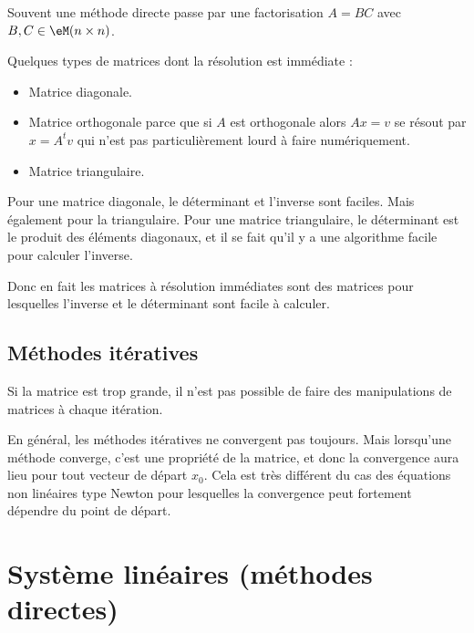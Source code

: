 Souvent une méthode directe passe par une factorisation \( A=BC\) avec \( B,C\in \eM(n\times n)\).

Quelques types de matrices dont la résolution est immédiate :
\begin{itemize}
    \item Matrice diagonale.
    \item Matrice orthogonale parce que si \( A\) est orthogonale alors \( Ax=v\) se résout par \( x=A^tv\) qui n'est pas particulièrement lourd à faire numériquement.
    \item Matrice triangulaire.
\end{itemize}

\begin{remark}
    Pour une matrice diagonale, le déterminant et l'inverse sont faciles. Mais également pour la triangulaire. Pour une matrice triangulaire, le déterminant est le produit des éléments diagonaux, et il se fait qu'il y a une algorithme facile pour calculer l'inverse.

    Donc en fait les matrices à résolution immédiates sont des matrices pour lesquelles l'inverse et le déterminant sont facile à calculer.
\end{remark}

\subsection{Méthodes itératives}

Si la matrice est trop grande, il n'est pas possible de faire des manipulations de matrices à chaque itération.

En général, les méthodes itératives ne convergent pas toujours. Mais lorsqu'une méthode converge, c'est une propriété de la matrice, et donc la convergence aura lieu pour tout vecteur de départ \( x_0\). Cela est très différent du cas des équations non linéaires type Newton pour lesquelles la convergence peut fortement dépendre du point de départ.

\section{Système linéaires (méthodes directes)}

